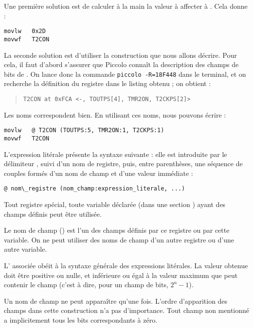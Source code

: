 Une première solution est de calculer à la main la valeur à affecter à . Cela donne :
\begin{lstlisting}[language=piccolo]
movlw   0x2D
movwf   T2CON
\end{lstlisting}

La seconde solution est d'utiliser la construction que nous allons décrire. Pour cela, il faut d'abord s’assurer que Piccolo connaît la description des champs de bits de . On lance donc la commande \texttt{piccolo -R=18F448} dans le terminal, et on recherche la définition du registre  dans le listing obtenu ; on obtient :
\begin{quote}
\texttt{\textquotesingle T2CON\textquotesingle~at 0xFCA <-, TOUTPS[4], TMR2ON, T2CKPS[2]>}
\end{quote}

Les noms correspondent bien. En utilisant ces noms, nous pouvons écrire :
\begin{lstlisting}[language=piccolo]
movlw   @ T2CON (TOUTPS:5, TMR2ON:1, T2CKPS:1)
movwf   T2CON
\end{lstlisting}

L'expression litérale présente la syntaxe suivante : elle est introduite par le délimiteur , suivi d’un nom de registre, puis, entre parenthèses, une séquence de couples formés d’un nom de champ et d’une valeur immédiate :
\begin{lstlisting}[language=piccolo]
  @ nom\_registre (nom_champ:expression_literale, ...)
\end{lstlisting}

Tout registre spécial, toute variable déclarée (dans une section ) ayant des champs définis peut être utilisée.

Le nom de champ () est l’un des champs définis par ce registre ou par cette variable. On ne peut utiliser des noms de champ d’un autre registre ou d’une autre variable.

L’ associée obéit à la syntaxe générale des expressions litérales. La valeur obtenue doit être positive ou nulle, et inférieure ou égal à la valeur maximum que peut contenir le champ (c’est à dire, pour un champ de  bits, $2^n-1$).

Un nom de champ ne peut apparaître qu’une fois. L’ordre d’apparition des champs dans cette construction n’a pas d’importance. Tout champ non mentionné a implicitement tous les bits correspondants à zéro.


